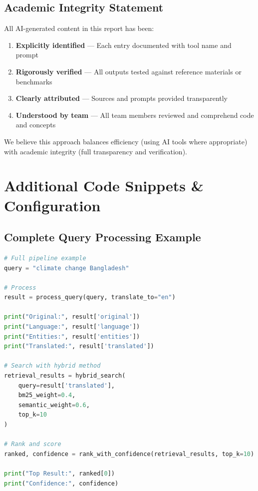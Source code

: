 \documentclass[12pt,a4paper]{report}
\begin{document}
\section{Academic Integrity Statement}

All AI-generated content in this report has been:
\begin{enumerate}
    \item \textbf{Explicitly identified} --- Each entry documented with tool name and prompt
    \item \textbf{Rigorously verified} --- All outputs tested against reference materials or benchmarks
    \item \textbf{Clearly attributed} --- Sources and prompts provided transparently
    \item \textbf{Understood by team} --- All team members reviewed and comprehend code and concepts
\end{enumerate}

We believe this approach balances efficiency (using AI tools where appropriate) with academic integrity (full transparency and verification).

\newpage

\chapter{Additional Code Snippets \& Configuration}

\section{Complete Query Processing Example}

\begin{lstlisting}[language=Python, caption=End-to-End Query Processing]
# Full pipeline example
query = "climate change Bangladesh"

# Process
result = process_query(query, translate_to="en")

print("Original:", result['original'])
print("Language:", result['language'])
print("Entities:", result['entities'])
print("Translated:", result['translated'])

# Search with hybrid method
retrieval_results = hybrid_search(
    query=result['translated'],
    bm25_weight=0.4,
    semantic_weight=0.6,
    top_k=10
)

# Rank and score
ranked, confidence = rank_with_confidence(retrieval_results, top_k=10)

print("Top Result:", ranked[0])
print("Confidence:", confidence)
\end{lstlisting}
\end{document}
